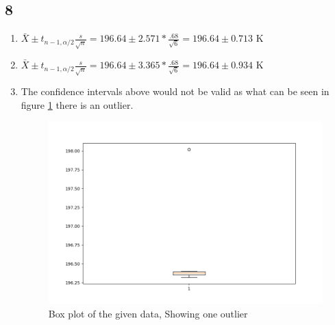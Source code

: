 \documentclass[12pt]{report}
\begin{document}
   \subsection*{8}
   \begin{enumerate}[label={\bf \alph*}]
   \item $\bar{X}\pm t_{n-1,\alpha/2}\frac{s}{\sqrt{n}}=196.64 \pm 2.571*\frac{.68}{\sqrt{6}}= 196.64 \pm 0.713$ K
   \item $\bar{X}\pm t_{n-1,\alpha/2}\frac{s}{\sqrt{n}}=196.64 \pm 3.365*\frac{.68}{\sqrt{6}}= 196.64 \pm 0.934$ K
   \item The confidence intervals above would not be valid as what can be seen in figure \ref{fig:2} there is an outlier.
      \begin{figure}[H]
	\begin{center}
		\includegraphics[width=.75\textwidth]{HW10boxplot2.png}
	\end{center}
	\caption{Box plot of the given data, Showing one outlier}
   \label{fig:2}
\end{figure}
   \end{enumerate}
\end{document}
